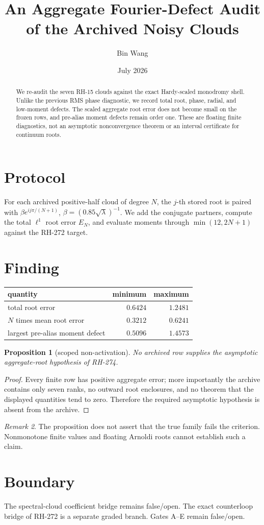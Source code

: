 \documentclass[11pt]{article}
\title{An Aggregate Fourier-Defect Audit of the Archived Noisy Clouds}\author{Bin Wang}\date{July 2026}
\newtheorem{proposition}{Proposition}[section]\theoremstyle{remark}\newtheorem{remark}[proposition]{Remark}
\begin{document}
\maketitle
\begin{abstract}
We re-audit the seven RH-15 clouds against the exact Hardy-scaled monodromy
shell.  Unlike the previous RMS phase diagnostic, we record total root,
phase, radial, and low-moment defects.  The scaled aggregate root error does
not become small on the frozen rows, and pre-alias moment defects remain
order one.  These are floating finite diagnostics, not an asymptotic
nonconvergence theorem or an interval certificate for continuum roots.
\end{abstract}
\section{Protocol}
For each archived positive-half cloud of degree $N$, the $j$-th stored root
is paired with
$\beta e^{ij\pi/(N+1)}$, $\beta=(0.85\sqrt\lambda)^{-1}$.  We add the
conjugate partners, compute the total $\ell^1$ root error $E_N$, and evaluate
moments through $\min(12,2N+1)$ against the RH-272 target.
\section{Finding}
\begin{center}\small
\begin{tabular}{lrr}
\toprule quantity & minimum & maximum\\\midrule
total root error & $0.6424$ & $1.2481$\\
$N$ times mean root error & $0.3212$ & $0.6241$\\
largest pre-alias moment defect & $0.5096$ & $1.4573$\\\bottomrule
\end{tabular}
\end{center}
\begin{proposition}[scoped non-activation]
No archived row supplies the asymptotic aggregate-root hypothesis of RH-274.
\end{proposition}
\begin{proof}
Every finite row has positive aggregate error; more importantly the archive
contains only seven ranks, no outward root enclosures, and no theorem that
the displayed quantities tend to zero.  Therefore the required asymptotic
hypothesis is absent from the archive.
\end{proof}
\begin{remark}
The proposition does not assert that the true family fails the criterion.
Nonmonotone finite values and floating Arnoldi roots cannot establish such a
claim.
\end{remark}
\section{Boundary}
The spectral-cloud coefficient bridge remains false/open.  The exact
counterloop bridge of RH-272 is a separate graded branch.  Gates A--E remain
false/open.
\end{document}
